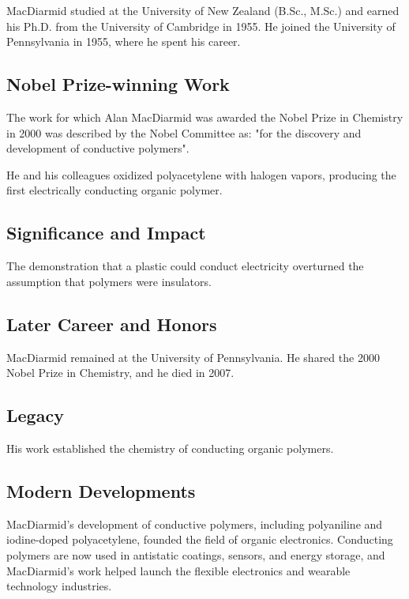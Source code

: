 MacDiarmid studied at the University of New Zealand (B.Sc., M.Sc.) and earned his Ph.D. from the University of Cambridge in 1955. He joined the University of Pennsylvania in 1955, where he spent his career.

\subsection*{Nobel Prize-winning Work}

The work for which Alan MacDiarmid was awarded the Nobel Prize in Chemistry in 2000 was described by the Nobel Committee as: "for the discovery and development of conductive polymers".

He and his colleagues oxidized polyacetylene with halogen vapors, producing the first electrically conducting organic polymer.

\subsection*{Significance and Impact}

The demonstration that a plastic could conduct electricity overturned the assumption that polymers were insulators.

\subsection*{Later Career and Honors}

MacDiarmid remained at the University of Pennsylvania. He shared the 2000 Nobel Prize in Chemistry, and he died in 2007.

\subsection*{Legacy}

His work established the chemistry of conducting organic polymers.

\subsection*{Modern Developments}

MacDiarmid's development of conductive polymers, including polyaniline and iodine-doped polyacetylene, founded the field of organic electronics. Conducting polymers are now used in antistatic coatings, sensors, and energy storage, and MacDiarmid's work helped launch the flexible electronics and wearable technology industries.

